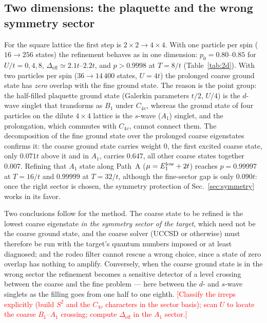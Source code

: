 \documentclass[
  aps,
  prc,
  reprint,
  superscriptaddress,
  floatfix,
  nofootinbib
]{revtex4-2}
\newcommand{\todo}[1]{\textcolor{red}{[#1]}}
\newcommand{\Deff}{\Delta_{\mathrm{eff}}}
\begin{document}
\subsection{Two dimensions: the plaquette and the wrong symmetry sector}
\label{sec:2d}
For the square lattice the first step is $2\times2\to4\times4$.  With one
particle per spin ($16\to256$ states) the refinement behaves as in one
dimension: $p_0=0.80$--$0.85$ for $U/t=0,4,8$, $\Deff\simeq2.1t$--$2.2t$,
and $p>0.9998$ at $T=8/t$ (Table~\ref{tab:2d}).  With two particles per
spin ($36\to14\,400$ states, $U=4t$) the prolonged coarse ground state has
\emph{zero} overlap with the fine ground state.  The reason is the point
group: the half-filled plaquette ground state (Galerkin parameters
$t/2$, $U/4$) is the $d$-wave singlet that transforms as $B_1$ under
$C_{4v}$, whereas the ground state of four particles on the dilute
$4\times4$ lattice is the $s$-wave ($A_1$) singlet, and the prolongation,
which commutes with $C_{4v}$, cannot connect them.  The decomposition of
the fine ground state over the prolonged coarse eigenstates confirms it:
the coarse ground state carries weight $0$, the first excited coarse state,
only $0.071t$ above it and in $A_1$, carries $0.647$, all other coarse
states together $0.007$.  Refining that $A_1$ state along Path~A
($\mu=E_1^{\rm low}+2t$) reaches $p=0.99997$ at $T=16/t$ and $0.99999$ at
$T=32/t$, although the fine-sector gap is only $0.090t$: once the right
sector is chosen, the symmetry protection of Sec.~\ref{sec:symmetry} works
in its favor.

Two conclusions follow for the method.  The coarse state to be refined is
the lowest coarse eigenstate \emph{in the symmetry sector of the target},
which need not be the coarse ground state, and the coarse solver (UCCSD or
otherwise) must therefore be run with the target's quantum numbers imposed
or at least diagnosed; and the rodeo filter cannot rescue a wrong choice,
since a state of zero overlap has nothing to amplify.  Conversely, when the
coarse ground state is in the wrong sector the refinement becomes a
sensitive detector of a level crossing between the coarse and the fine
problem --- here between the $d$- and $s$-wave singlets as the filling goes
from one half to one eighth.  \todo{Classify the irreps explicitly (build
$S^2$ and the $C_{4v}$ characters in the sector basis); scan $U$ to locate
the coarse $B_1$--$A_1$ crossing; compute $\Deff$ in the $A_1$ sector.}
\end{document}
